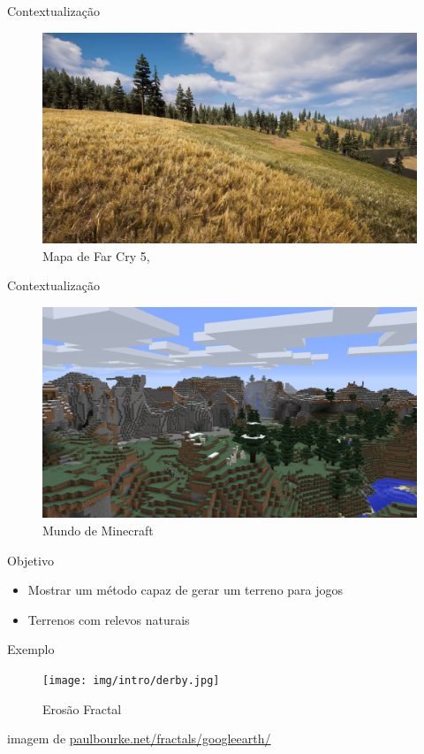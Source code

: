 \begin{frame}{Contextualização}
    \begin{figure}
		\centering
        \includegraphics[width=.8\textwidth]{img/intro/fc5terrain.png}
        \caption{Mapa de \alert{Far Cry 5}, \cite{Carrier2018farcry5}}
    \end{figure}
\end{frame}

\begin{frame}{Contextualização}
    \begin{figure}
		\centering
        \includegraphics[width=.8\textwidth]{img/intro/mineExtremeHills.png}
        \caption{Mundo de \alert{Minecraft}}
    \end{figure}  
\end{frame}

\begin{frame}{Objetivo}
    \begin{itemize}
        \item Mostrar um método capaz de gerar um terreno para jogos
        \item Terrenos com relevos \alert{naturais}
    \end{itemize}
\end{frame}

\begin{frame}{Exemplo}
    \begin{figure}
		\centering
        \texttt{[image: img/intro/derby.jpg]}
        \caption{Erosão Fractal}
    \end{figure}
    imagem de \url{paulbourke.net/fractals/googleearth/}
\end{frame}